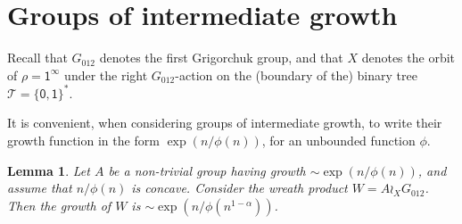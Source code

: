 \documentclass{amsart}
\newcommand\Grig{{G_{012}}}
\newtheorem{lemma}{Lemma}[section]
\theoremstyle{definition}
\begin{document}
\section{Groups of intermediate growth}
Recall that $\Grig$ denotes the first Grigorchuk group, and that $X$
denotes the orbit of $\rho=\mathsf1^\infty$ under the right
$\Grig$-action on the (boundary of the) binary tree $\mathcal
T=\{\mathsf0,\mathsf1\}^*$.

It is convenient, when considering groups of intermediate growth, to
write their growth function in the form $\exp(n/\phi(n))$, for an
unbounded function $\phi$.

\begin{lemma}\label{lem:interm}
  Let $A$ be a non-trivial group having growth $\sim\exp(n/\phi(n))$,
  and assume that $n/\phi(n)$ is concave. Consider the wreath product
  $W=A\wr_X\Grig$. Then the growth of $W$ is $\sim
  \exp(n/\phi(n^{1-\alpha}))$.
\end{lemma}
\end{document}
